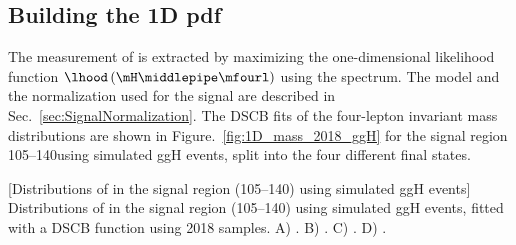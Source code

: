 \subsection{Building the 1D pdf}
The measurement of \mH is extracted by maximizing the one-dimensional likelihood function $\lhood \left( \mH \middlepipe \mfourl \right)$ using the \mfourl spectrum.  %
The model and the normalization used for the signal are described in Sec.~\ref{sec:SignalNormalization}.
The DSCB fits of the four-lepton invariant mass distributions are shown in Figure.~\ref{fig:1D_mass_2018_ggH} for the signal region 105--140\GeV using simulated ggH events, split into the four different final states.
\begin{multiFigure}
    \centering
        [Distributions of \mfourl in the signal region (105--140\GeV) using simulated ggH events]
        {Distributions of \mfourl in the signal region (105--140\GeV) using simulated ggH events, fitted with a DSCB function using 2018 samples.
        \;A) \fourmu.
        \;B) \foure.
        \;C) \twoetwomu.
        \;D) \twomutwoe.}
    \label{fig:1D_mass_2018_ggH}
\end{multiFigure}


